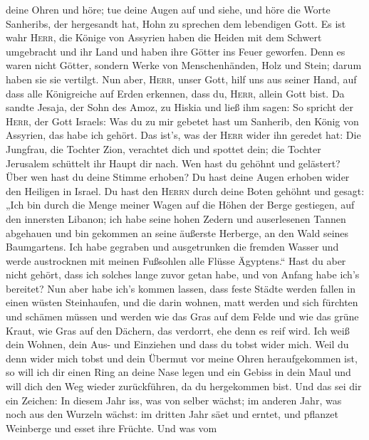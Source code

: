 deine Ohren und höre; tue deine Augen auf und siehe, und höre die Worte
Sanheribs, der hergesandt hat, Hohn zu sprechen dem lebendigen Gott.
 Es ist wahr \textsc{Herr}, die Könige von Assyrien haben
die Heiden mit dem Schwert umgebracht und ihr Land  und
haben ihre Götter ins Feuer geworfen. Denn es waren nicht Götter,
sondern Werke von Menschenhänden, Holz und Stein; darum haben sie sie
vertilgt.  Nun aber, \textsc{Herr}, unser Gott, hilf uns
aus seiner Hand, auf dass alle Königreiche auf Erden erkennen, dass du,
\textsc{Herr}, allein Gott bist.  Da sandte Jesaja, der
Sohn des Amoz, zu Hiskia und ließ ihm sagen: So spricht der
\textsc{Herr}, der Gott Israels: Was du zu mir gebetet hast um Sanherib,
den König von Assyrien, das habe ich gehört.  Das ist's,
was der \textsc{Herr} wider ihn geredet hat: Die Jungfrau, die Tochter
Zion, verachtet dich und spottet dein; die Tochter Jerusalem schüttelt
ihr Haupt dir nach.  Wen hast du gehöhnt und gelästert?
Über wen hast du deine Stimme erhoben? Du hast deine Augen erhoben wider
den Heiligen in Israel.  Du hast den \textsc{Herrn} durch
deine Boten gehöhnt und gesagt: „Ich bin durch die Menge meiner Wagen
auf die Höhen der Berge gestiegen, auf den innersten Libanon; ich habe
seine hohen Zedern und auserlesenen Tannen abgehauen und bin gekommen an
seine äußerste Herberge, an den Wald seines Baumgartens. 
Ich habe gegraben und ausgetrunken die fremden Wasser und werde
austrocknen mit meinen Fußsohlen alle Flüsse Ägyptens.`` 
Hast du aber nicht gehört, dass ich solches lange zuvor getan habe, und
von Anfang habe ich's bereitet? Nun aber habe ich's kommen lassen, dass
feste Städte werden fallen in einen wüsten Steinhaufen, 
und die darin wohnen, matt werden und sich fürchten und schämen müssen
und werden wie das Gras auf dem Felde und wie das grüne Kraut, wie Gras
auf den Dächern, das verdorrt, ehe denn es reif wird. 
Ich weiß dein Wohnen, dein Aus- und Einziehen und dass du tobst wider
mich.  Weil du denn wider mich tobst und dein Übermut vor
meine Ohren heraufgekommen ist, so will ich dir einen Ring an deine Nase
legen und ein Gebiss in dein Maul und will dich den Weg wieder
zurückführen, da du hergekommen bist.  Und das sei dir
ein Zeichen: In diesem Jahr iss, was von selber wächst; im anderen Jahr,
was noch aus den Wurzeln wächst: im dritten Jahr säet und erntet, und
pflanzet Weinberge und esset ihre Früchte.  Und was vom
